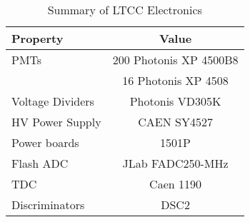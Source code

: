 \begin{table}[h]
	\begin{center}
		\begin{tabular}{| l | c |}
			\hline \hline
			Property                 & Value \\
			\hline
			PMTs             & 200 Photonis XP 4500B8    \\
	                       & 16 Photonis XP 4508       \\
			Voltage Dividers & Photonis VD305K           \\
			HV Power Supply  & CAEN SY4527               \\
			Power boards     & 1501P                     \\
			Flash ADC        & JLab FADC250-MHz          \\
			TDC              & Caen 1190                 \\
			Discriminators   & DSC2                      \\
			\hline \hline
		\end{tabular}
	\end{center}
	\caption{Summary of LTCC Electronics}\label{tab:ltccChannels}
\end{table}


